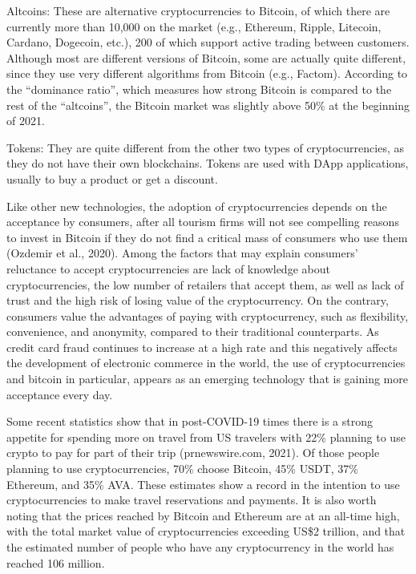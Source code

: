 \documentclass[
  letterpaper,
  DIV=11,
  numbers=noendperiod]{scrreprt}
\begin{document}
Altcoins: These are alternative cryptocurrencies to Bitcoin, of which
there are currently more than 10,000 on the market (e.g., Ethereum,
Ripple, Litecoin, Cardano, Dogecoin, etc.), 200 of which support active
trading between customers. Although most are different versions of
Bitcoin, some are actually quite different, since they use very
different algorithms from Bitcoin (e.g., Factom). According to the
``dominance ratio'', which measures how strong Bitcoin is compared to
the rest of the ``altcoins'', the Bitcoin market was slightly above 50\%
at the beginning of 2021.

Tokens: They are quite different from the other two types of
cryptocurrencies, as they do not have their own blockchains. Tokens are
used with DApp applications, usually to buy a product or get a discount.

Like other new technologies, the adoption of cryptocurrencies depends on
the acceptance by consumers, after all tourism firms will not see
compelling reasons to invest in Bitcoin if they do not find a critical
mass of consumers who use them (Ozdemir et al., 2020). Among the factors
that may explain consumers' reluctance to accept cryptocurrencies are
lack of knowledge about cryptocurrencies, the low number of retailers
that accept them, as well as lack of trust and the high risk of losing
value of the cryptocurrency. On the contrary, consumers value the
advantages of paying with cryptocurrency, such as flexibility,
convenience, and anonymity, compared to their traditional counterparts.
As credit card fraud continues to increase at a high rate and this
negatively affects the development of electronic commerce in the world,
the use of cryptocurrencies and bitcoin in particular, appears as an
emerging technology that is gaining more acceptance every day.

Some recent statistics show that in post-COVID-19 times there is a
strong appetite for spending more on travel from US travelers with 22\%
planning to use crypto to pay for part of their trip (prnewswire.com,
2021). Of those people planning to use cryptocurrencies, 70\% choose
Bitcoin, 45\% USDT, 37\% Ethereum, and 35\% AVA. These estimates show a
record in the intention to use cryptocurrencies to make travel
reservations and payments. It is also worth noting that the prices
reached by Bitcoin and Ethereum are at an all-time high, with the total
market value of cryptocurrencies exceeding US\$2 trillion, and that the
estimated number of people who have any cryptocurrency in the world has
reached 106 million.
\end{document}
